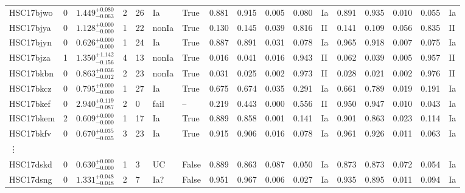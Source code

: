 \documentclass[useamsfonts]{pasj01}
\begin{document}
\begin{table}[htbp]
{\begin{tabular}{p{4.5em}p{1.2em}p{4.0em}p{2.1em}|p{0.6em}p{1.8em}p{3.0em}|p{2.9em}|p{1.2em}p{1.2em}p{1.2em}p{0.6em}|p{2.9em}|p{1.2em}p{1.2em}p{1.2em}p{0.6em}}
HSC17bjwo &     0 &    $1.449_{-0.063}^{+0.080}$ &         2 &   26 &     Ia &     True &    0.881 &    0.915 &    0.005 &    0.080 &      Ia &    0.891 &    0.935 &    0.010 &    0.055 &      Ia \\
HSC17bjya &     0 &    $1.128_{-0.000}^{+0.000}$ &         1 &   22 &  nonIa &     True &    0.130 &    0.145 &    0.039 &    0.816 &      II &    0.141 &    0.109 &    0.056 &    0.835 &      II \\
HSC17bjyn &     0 &    $0.626_{-0.000}^{+0.000}$ &         1 &   24 &     Ia &     True &    0.887 &    0.891 &    0.031 &    0.078 &      Ia &    0.965 &    0.918 &    0.007 &    0.075 &      Ia \\
HSC17bjza &     1 &    $1.350_{-0.156}^{+1.142}$ &         4 &   13 &  nonIa &     True &    0.016 &    0.041 &    0.016 &    0.943 &      II &    0.062 &    0.039 &    0.005 &    0.957 &      II \\
HSC17bkbn &     0 &    $0.863_{-0.012}^{+0.036}$ &         2 &   23 &  nonIa &     True &    0.031 &    0.025 &    0.002 &    0.973 &      II &    0.028 &    0.021 &    0.002 &    0.976 &      II \\
HSC17bkcz &     0 &    $0.795_{-0.000}^{+0.000}$ &         1 &   27 &     Ia &     True &    0.675 &    0.674 &    0.035 &    0.291 &      Ia &    0.661 &    0.789 &    0.019 &    0.191 &      Ia \\
HSC17bkef &     0 &    $2.940_{-0.087}^{+0.119}$ &         2 &    0 &   fail &    -- &    0.219 &    0.443 &    0.000 &    0.556 &      II &    0.950 &    0.947 &    0.010 &    0.043 &      Ia \\
HSC17bkem &     2 &    $0.609_{-0.000}^{+0.000}$ &         1 &   17 &     Ia &     True &    0.889 &    0.858 &    0.001 &    0.141 &      Ia &    0.901 &    0.863 &    0.023 &    0.114 &      Ia \\
HSC17bkfv &     0 &    $0.670_{-0.035}^{+0.035}$ &         3 &   23 &     Ia &     True &    0.915 &    0.906 &    0.016 &    0.078 &      Ia &    0.961 &    0.926 &    0.011 &    0.063 &      Ia \\
\vdots & & & & & & & & & & & & & & & &\\
HSC17dskd &     0 &    $0.630_{-0.000}^{+0.000}$ &         1 &    3 &  UC &   False &    0.889 &    0.863 &    0.087 &    0.050 &      Ia &    0.873 &    0.873 &    0.072 &    0.054 &      Ia \\
HSC17dsng &     0 &    $1.331_{-0.048}^{+0.048}$ &         2 &    7 &    Ia? &   False &    0.951 &    0.967 &    0.006 &    0.027 &      Ia &    0.935 &    0.895 &    0.011 &    0.094 &      Ia \\

\end{tabular}}
\end{table}
\end{document}
